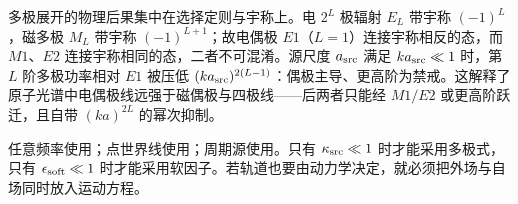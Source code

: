 多极展开的物理后果集中在选择定则与宇称上。电 $2^L$ 极辐射 $E_L$ 带宇称 $(-1)^L$，磁多极 $M_L$ 带宇称 $(-1)^{L+1}$；故电偶极 $E1$（$L=1$）连接宇称相反的态，而 $M1$、$E2$ 连接宇称相同的态，二者不可混淆。源尺度 $a_{\rm src}$ 满足 $ka_{\rm src}\ll1$ 时，第 $L$ 阶多极功率相对 $E1$ 被压低 $(ka_{\rm src})^{2(L-1)}$：偶极主导、更高阶为禁戒。这解释了原子光谱中电偶极线远强于磁偶极与四极线——后两者只能经 $M1/E2$ 或更高阶跃迁，且自带 $(ka)^{2L}$ 的幂次抑制。

任意频率使用；点世界线使用；周期源使用。只有 \(\kappa_{\rm src}\ll1\) 时才能采用多极式，只有 \(\epsilon_{\rm soft}\ll1\) 时才能采用软因子。若轨道也要由动力学决定，就必须把外场与自场同时放入运动方程。
